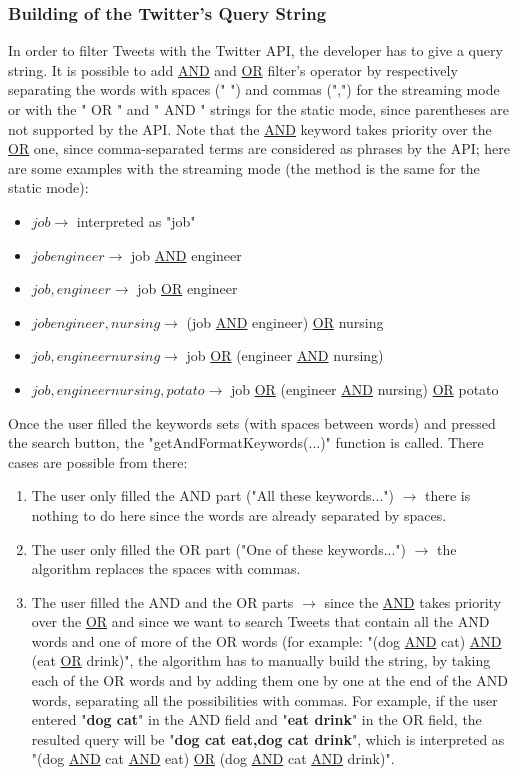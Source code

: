 \documentclass[a4paper,11pt]{report}
\begin{document}
\subsubsection{Building of the Twitter's Query String}
\label{buildingTwitterQueryString}
In order to filter Tweets with the Twitter API, the developer has to give a query string. It is possible to add \underline{AND} and \underline{OR} filter's operator by respectively separating the words with spaces (" ") and commas (",") for the streaming mode or with the " OR " and " AND " strings for the static mode, since parentheses are not supported by the API. Note that the \underline{AND} keyword takes priority over the \underline{OR} one, since comma-separated terms are considered as phrases by the API; here are some examples with the streaming mode (the method is the same for the static mode):
\begin{itemize}
	\item $job\to$ interpreted as "job"
	\item $job engineer\to$ job \underline{AND} engineer
	\item $job,engineer\to$ job \underline{OR} engineer
	\item $job engineer,nursing\to$ (job \underline{AND} engineer) \underline{OR} nursing
	\item $job,engineer nursing\to$ job \underline{OR} (engineer \underline{AND} nursing)
	\item $job,engineer nursing,potato\to$ job \underline{OR} (engineer \underline{AND} nursing) \underline{OR} potato
\end{itemize}

Once the user filled the keywords sets (with spaces between words) and pressed the search button, the "getAndFormatKeywords(...)" function is called. There cases are possible from there:
\begin{enumerate}
	\item The user only filled the AND part ("All these keywords...") $\to$ there is nothing to do here since the words are already separated by spaces.
	\item The user only filled the OR part ("One of these keywords...") $\to$ the algorithm replaces the spaces with commas.
	\item The user filled the AND and the OR parts $\to$ since the \underline{AND} takes priority over the \underline{OR} and since we want to search Tweets that contain all the AND words and one of more of the OR words (for example: "(dog \underline{AND} cat) \underline{AND} (eat \underline{OR} drink)", the algorithm has to manually build the string, by taking each of the OR words and by adding them one by one at the end of the AND words, separating all the possibilities with commas. For example, if the user entered "\textbf{dog cat}" in the AND field and "\textbf{eat drink}" in the OR field, the resulted query will be "\textbf{dog cat eat,dog cat drink}", which is interpreted as "(dog \underline{AND} cat \underline{AND} eat) \underline{OR} (dog \underline{AND} cat \underline{AND} drink)".
\end{enumerate}
\end{document}
